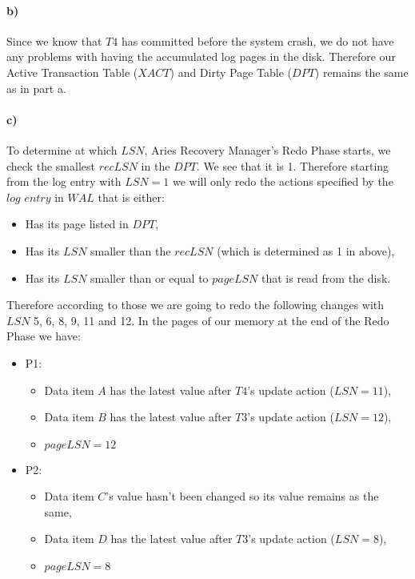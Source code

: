 \documentclass[a4paper,12pt]{article}
\begin{document}
\paragraph{b)}
Since we know that $T4$ has committed before the system crash, we do not have any problems with having the accumulated log pages in the disk. Therefore our Active Transaction Table ($XACT$) and Dirty Page Table ($DPT$) remains the same as in part a.
\paragraph{c)}
To determine at which $LSN$, Aries Recovery Manager’s Redo Phase starts, we check the smallest $recLSN$ in the $DPT$. We see that it is 1. Therefore starting from the log entry with $LSN=1$ we will only redo the actions specified by the $log$ $entry$ in $WAL$ that is either:
\begin{itemize}
    \item Has its page listed in $DPT$,
    \item Has its $LSN$ smaller than the $recLSN$ (which is determined as 1 in above),
    \item Has its $LSN$ smaller than or equal to $pageLSN$ that is read from the disk.
\end{itemize}
Therefore according to those we are going to redo the following changes with $LSN$ 5, 6, 8, 9, 11 and 12. In the pages of our memory at the end of the Redo Phase we have:
\begin{itemize}
    \item P1:
    \begin{itemize}
        \item Data item $A$ has the latest value after $T4$’s update action ($LSN=11$),
        \item Data item $B$ has the latest value after $T3$’s update action ($LSN=12$),
        \item $pageLSN=12$ 
    \end{itemize}
    \item P2:
    \begin{itemize}
        \item Data item $C$'s value hasn’t been changed so its value remains as the same,
        \item Data item $D$ has the latest value after $T3$’s update action ($LSN=8$),
        \item $pageLSN=8$ 
    \end{itemize}
\end{itemize}
\end{document}
